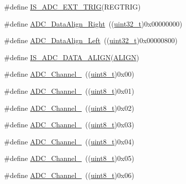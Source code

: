 \begin{DoxyCompactItemize}
\item 
\#define \hyperlink{group___a_d_c__external__trigger__sources__for__regular__channels__conversion_gac74e6054adbedd72822cacde69105318}{I\+S\+\_\+\+A\+D\+C\+\_\+\+E\+X\+T\+\_\+\+T\+R\+IG}(R\+E\+G\+T\+R\+IG)
\item 
\#define \hyperlink{group___a_d_c__data__align_ga80b5d2f2b6b058bc498f58e0a92ad035}{A\+D\+C\+\_\+\+Data\+Align\+\_\+\+Right}~((\hyperlink{_p_e___types_8h_a33594304e786b158f3fb30289278f5af}{uint32\+\_\+t})0x00000000)
\item 
\#define \hyperlink{group___a_d_c__data__align_ga87c2b7021bc288174d5d6175dc267251}{A\+D\+C\+\_\+\+Data\+Align\+\_\+\+Left}~((\hyperlink{_p_e___types_8h_a33594304e786b158f3fb30289278f5af}{uint32\+\_\+t})0x00000800)
\item 
\#define \hyperlink{group___a_d_c__data__align_ga2903b620e3c61dc47ed8c0fbf4197801}{I\+S\+\_\+\+A\+D\+C\+\_\+\+D\+A\+T\+A\+\_\+\+A\+L\+I\+GN}(\hyperlink{usb__devapi_8h_ae4ff5a07c6ff43ed11a3887ef7d524f2}{A\+L\+I\+GN})
\item 
\#define \hyperlink{group___a_d_c__channels_ga40ec353803e9470a5721ef5bf0b1ab24}{A\+D\+C\+\_\+\+Channel\+\_}~((\hyperlink{_p_e___types_8h_aba7bc1797add20fe3efdf37ced1182c5}{uint8\+\_\+t})0x00)
\item 
\#define \hyperlink{group___a_d_c__channels_ga0b04cebf8d62085eca6dc7daa3d5d3f0}{A\+D\+C\+\_\+\+Channel\+\_}~((\hyperlink{_p_e___types_8h_aba7bc1797add20fe3efdf37ced1182c5}{uint8\+\_\+t})0x01)
\item 
\#define \hyperlink{group___a_d_c__channels_gabc66e2529583e11b591efd2df7070571}{A\+D\+C\+\_\+\+Channel\+\_}~((\hyperlink{_p_e___types_8h_aba7bc1797add20fe3efdf37ced1182c5}{uint8\+\_\+t})0x02)
\item 
\#define \hyperlink{group___a_d_c__channels_ga9f93cbacd030f1c79f96f8889b0cdee6}{A\+D\+C\+\_\+\+Channel\+\_}~((\hyperlink{_p_e___types_8h_aba7bc1797add20fe3efdf37ced1182c5}{uint8\+\_\+t})0x03)
\item 
\#define \hyperlink{group___a_d_c__channels_gafc7218417f729659dd8f06185cc2eafa}{A\+D\+C\+\_\+\+Channel\+\_}~((\hyperlink{_p_e___types_8h_aba7bc1797add20fe3efdf37ced1182c5}{uint8\+\_\+t})0x04)
\item 
\#define \hyperlink{group___a_d_c__channels_ga42822abae41faabde2a2da877e0cc854}{A\+D\+C\+\_\+\+Channel\+\_}~((\hyperlink{_p_e___types_8h_aba7bc1797add20fe3efdf37ced1182c5}{uint8\+\_\+t})0x05)
\item 
\#define \hyperlink{group___a_d_c__channels_ga7e24a73eec4aeb7d8e2f9008825ceacb}{A\+D\+C\+\_\+\+Channel\+\_}~((\hyperlink{_p_e___types_8h_aba7bc1797add20fe3efdf37ced1182c5}{uint8\+\_\+t})0x06)

\end{DoxyCompactItemize}
